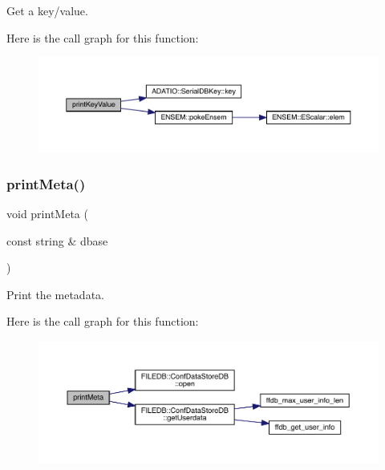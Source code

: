 Get a key/value. 

Here is the call graph for this function\+:
\nopagebreak
\begin{figure}[H]
\begin{center}
\leavevmode
\includegraphics[width=350pt]{d4/d74/adat-devel_2main_2dbutil_2dbgraph__convert_8cc_a1c5a310406bc62a92190de39689f1005_cgraph}
\end{center}
\end{figure}
\mbox{\label{adat-devel_2main_2dbutil_2dbgraph__convert_8cc_a0577d572da492642f9cf5f404d0116d9}} 
\subsubsection{\texorpdfstring{printMeta()}{printMeta()}}
{\footnotesize\ttfamily void print\+Meta (\begin{DoxyParamCaption}\item[{const string \&}]{dbase }\end{DoxyParamCaption})}



Print the metadata. 

Here is the call graph for this function\+:
\nopagebreak
\begin{figure}[H]
\begin{center}
\leavevmode
\includegraphics[width=350pt]{d4/d74/adat-devel_2main_2dbutil_2dbgraph__convert_8cc_a0577d572da492642f9cf5f404d0116d9_cgraph}
\end{center}
\end{figure}
